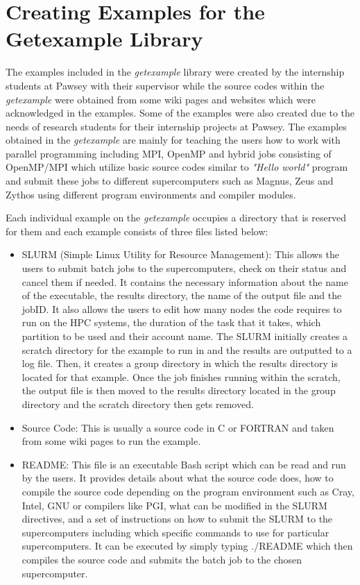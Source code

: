 \section{Creating Examples for the Getexample Library}

The examples included in the \emph{getexample} library were created by the internship students at Pawsey with their supervisor while the source codes within the
\emph{getexample} were obtained from some wiki pages and websites which were acknowledged in the examples. Some of the examples were also created due to the
needs of research students for their internship projects at Pawsey. The examples obtained in the \emph{getexample} are mainly for teaching the users how to work
with parallel programming including MPI, OpenMP and hybrid jobs consisting of OpenMP/MPI which utilize basic source codes similar to \emph{"Hello world"} 
program and submit these jobs to different supercomputers such as Magnus, Zeus and Zythos using different program environments and compiler modules. 

Each individual example on the \emph{getexample} occupies a directory that is reserved for them and each example consists of three files listed below:

\begin{itemize}    
\item SLURM (Simple Linux Utility for Resource Management): This allows the users to submit batch jobs to the supercomputers, check on their status and 
cancel them if needed. It contains the necessary information about the name of the executable, the results directory, the name of the output file and 
the jobID. It also allows the users to edit how many nodes the code requires to run on the HPC systems, the duration of the task that it takes, which 
partition to be used and their account name. The SLURM initially creates a scratch directory for the example to run in and the results are outputted to 
a log file. Then, it creates a group directory in which the results directory is located for that example. Once the job finishes running within the 
scratch, the output file is then moved to the results directory located in the group directory and the scratch directory then gets removed.
\item Source Code: This is usually a source code in C or FORTRAN and taken from some wiki pages to run the example.
\item README: This file is an executable Bash script which can be read and run by the users. It provides details about what the source code does,
how to compile the source code depending on the program environment such as Cray, Intel, GNU or compilers like PGI, what can be modified in the SLURM 
directives, and a set of instructions on how to submit the SLURM to the supercomputers including which specific commands to use for particular 
supercomputers. It can be executed by simply typing ./README which then compiles the source code and submits the batch job to the chosen supercomputer.
\end{itemize}

